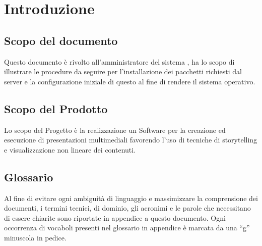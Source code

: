 \section{Introduzione}
\subsection{Scopo del documento}
Questo documento è rivolto all’amministratore del sistema \premi, ha lo scopo di illustrare le procedure da seguire per l'installazione dei pacchetti richiesti dal server e la configurazione iniziale di questo al fine di rendere il sistema \premi operativo.
\subsection{Scopo del Prodotto}
Lo scopo del Progetto è la realizzazione un Software per la creazione ed esecuzione di presentazioni multimediali favorendo l’uso di tecniche di storytelling e visualizzazione non lineare dei contenuti.
\subsection{Glossario}
Al fine di evitare ogni ambiguità di linguaggio e massimizzare la comprensione dei documenti, i termini tecnici, di dominio, gli acronimi e le parole che necessitano di essere chiarite sono riportate in appendice a questo documento. Ogni occorrenza di vocaboli presenti nel glossario in appendice è marcata da una “g” minuscola in pedice.
